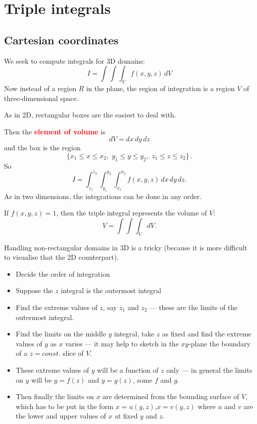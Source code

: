 \documentclass{article}
\begin{document}
\section{Triple integrals}
\subsection{Cartesian coordinates}

We seek to compute integrals for 3D domains:
$$
I = \int \int \int_V f(x,y,z) \, dV
$$
Now instead of a region $R$ in the plane, the region of
integration is a region $V$ of three-dimensional space.

As in 2D, rectangular boxes are the easiest to deal with.
 
Then the \textcolor{red}{\bf element of volume} is
$$
dV = dx\, dy \, dz
$$ 
and the box is the region 
$$
\lbrace x_1 \leq x \leq x_2, \,\,y_1 \leq y \leq y_2, \,\, z_1 \leq z \leq z_2 \rbrace \,.
$$
So
$$
I = \int_{z_1}^{z_2} \int_{y_1}^{y_2} \int_{x_1}^{x_2} f(x,y,z) \,
dx \, dy \, dz. 
$$ 
As in two dimensions, the integrations can be
done in any order.


If $f(x,y,z)=1$, then the triple integral represents the volume of $V$:
$$
V = \int \int \int_V  dV.
$$


Handling non-rectangular domains in 3D is a tricky (because it is more difficult to 
visualise that the 2D counterpart).
\begin{itemize}
\item
Decide the order of integration
\item
Suppose the $z$ integral is the outermost integral
\item
Find the extreme values of $z$, say $z_1$ and $z_2$ --- these
are the limits of the outermost integral. 
\item
Find the limits on the middle $y$ integral, take $z$ as fixed and find the extreme
values of $y$ as $x$ varies --- it may help to
sketch in the $xy$-plane the boundary of a $z = const.$ slice of
$V$. 
\item
These extreme values of $y$ will be a function of $z$ only --- in general the limits on $y$ will be $y=f(z)$ and $y=g(z)$, some $f$ and $g$.
\item
Then finally the limits on $x$ are determined from the bounding surface
of $V$, which has to be put in the form $x= u(y,z)$,$x=v(y,z)$
where $u$ and $v$ are the lower and upper values of $x$ at fixed
$y$ and $z$.
\end{itemize}
\end{document}
